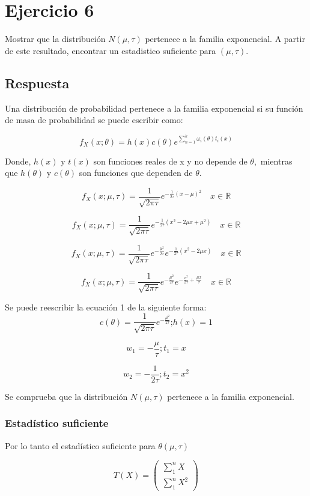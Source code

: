 \documentclass[11pt]{article}
\begin{document}
\section*{Ejercicio 6}
Mostrar que la distribución \(N(\mu, \tau)\) pertenece a la familia exponencial. A partir de este resultado,
encontrar un estadistico suficiente para \((\mu, \tau)\).
\subsection*{Respuesta}
Una distribución de probabilidad pertenece a la familia exponencial si su función de masa de probabilidad se puede escribir como:

\begin{equation}
f_{X}(x ; \theta)=h(x) c(\theta) e^{\sum_{n=1}^{k} \omega_{i}(\theta) t_{i}(x)} 
\end{equation}

Donde, \(h(x) \text{ y }  t(x)\) son funciones reales de x y no depende de \(\theta,\) mientras que \(h(\theta) \text{ y } c(\theta)\) son funciones que dependen de \(\theta\).


$$
f_{X}(x; \mu ,\tau)=\frac{1}{\sqrt{2 \pi \tau}} e^{-\frac{1}{2 \tau}(x-\mu)^{2}} \quad x \in \mathbb{R}
$$

$$
f_{X}(x; \mu ,\tau)=\frac{1}{\sqrt{2 \pi \tau}} e^{-\frac{1}{2 \tau}(x^2-2\mu x +\mu^2)} \quad x \in \mathbb{R}
$$

$$
f_{X}(x; \mu ,\tau)=\frac{1}{\sqrt{2 \pi \tau}} e^{-\frac{\mu^2}{2 \tau}} e^{-\frac{1}{2 \tau}(x^2-2\mu x )} \quad x \in \mathbb{R}
$$

$$
f_{X}(x; \mu ,\tau)=\frac{1}{\sqrt{2 \pi \tau}} e^{-\frac{\mu^2}{2 \tau}} e^{-\frac{x^2}{2 \tau}+\frac{\mu x}{{\tau}} } \quad x \in \mathbb{R}
$$

Se puede reescribir la ecuación 1 de la siguiente forma:
$$c(\theta)=\frac{1}{\sqrt{2 \pi \tau}} e^{-\frac{\mu^2}{2 \tau}} \text{;} h(x) = 1$$

$$w_{1} = -\frac{\mu}{\tau} ;  t_{1}= x$$

$$ w_{2} = -\frac{1}{2 \tau} ;  t_{2}= x^2$$

Se comprueba que la distribución \(N(\mu, \tau)\) pertenece a la familia exponencial.
\subsubsection*{Estadístico suficiente}

Por lo tanto el estadístico suficiente para \(\theta (\mu, \tau)\) 

$$
T(X)= \begin{pmatrix} \sum_{1}^n X \\\sum_{1}^n X^2 \end{pmatrix}
$$
\end{document}
